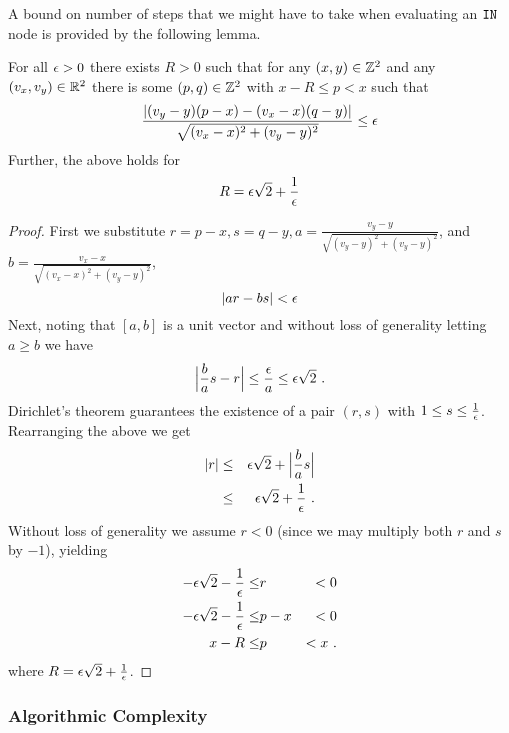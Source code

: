 A bound on number of steps that we might have to take when evaluating
an $\INlabel$ node is provided by the following lemma.
\newcommand\xa{p}
\newcommand\ya{q}
\begin{lemma}
  For all $\RoundoffEps>0$ there exists $R>0$ such that for any
  $(x,y)\in\Ints^2$ and any $(v_x,v_y)\in\Reals^2$ there is some
  $(\xa,\ya)\in\Ints^2$ with $x-R\leq\xa<x$ such that
  \begin{equation}
    \frac{|(v_y-y)(\xa-x) - (v_x-x)(\ya-y)|}
         {\sqrt{(v_x-x)^2+(v_y-y)^2}}
    \leq \RoundoffEps
  \end{equation}
  Further, the above holds for
  \begin{equation}
    R = \RoundoffEps\sqrt{2} + \frac{1}{\RoundoffEps}
  \end{equation}
\end{lemma}
\begin{proof}
  First we substitute $r=\xa-x, s=\ya-y, a =
  \frac{v_y-y}{\sqrt{(v_y-y)^2+(v_y-y)^2}}$, and $b =
  \frac{v_x-x}{\sqrt{(v_x-x)^2+(v_y-y)^2}}$,
  \begin{equation}
    |ar - bs| < \RoundoffEps
  \end{equation}
  Next, noting that $[a,b]$ is a unit vector and without loss of
  generality letting $a \geq b$ we have
  \begin{equation}
    \Bigl|\frac{b}{a}s - r\Bigr| \leq \frac{\RoundoffEps}{a} 
      \leq \RoundoffEps \sqrt{2} ~.
  \end{equation}
  Dirichlet's theorem \cite{Dirichlet1863} guarantees the existence of a pair $(r,s)$
  with $1 \leq s\leq\frac{1}{\RoundoffEps}$. Rearranging the above we get
  \begin{eqnarray}
    |r| &\leq& \RoundoffEps\sqrt{2} + \Bigl|\frac{b}{a}s\Bigr|\\
    &\leq& \RoundoffEps\sqrt{2} + \frac{1}{\RoundoffEps}~.
  \end{eqnarray}
  Without loss of generality we assume $r<0$ (since we may multiply
  both $r$ and $s$ by $-1$), yielding
  \begin{eqnarray}
    -\RoundoffEps\sqrt{2} - \frac{1}{\RoundoffEps} \leq &r& < 0\\
    -\RoundoffEps\sqrt{2} - \frac{1}{\RoundoffEps} \leq &p-x& < 0\\
    x-R \leq &p& < x ~.
  \end{eqnarray}
  where $R = \RoundoffEps\sqrt{2}+\frac{1}{\RoundoffEps}$.
\end{proof}

\subsubsection{Algorithmic Complexity}

